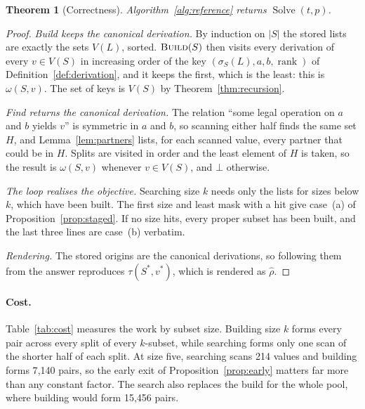 \documentclass[11pt,a4paper]{article}
\newtheorem{theorem}{Theorem}[section]
\theoremstyle{definition}
\theoremstyle{remark}
\newcommand{\proc}[1]{\textnormal{\textsc{#1}}}
\begin{document}
\begin{theorem}[Correctness]\label{thm:correct}
Algorithm~\ref{alg:reference} returns $\operatorname{Solve}(t, p)$.
\end{theorem}

\begin{proof}
\emph{Build keeps the canonical derivation.} By induction on $|S|$ the stored lists are exactly the sets
$V(L)$, sorted. $\proc{Build}(S)$ then visits every derivation of every $v \in V(S)$ in increasing order of
the key $(\sigma_S(L), a, b, \operatorname{rank})$ of Definition~\ref{def:derivation}, and it keeps the first,
which is the least: this is $\omega(S, v)$. The set of keys is $V(S)$ by Theorem~\ref{thm:recursion}.

\emph{Find returns the canonical derivation.} The relation ``some legal operation on $a$ and $b$ yields $v$''
is symmetric in $a$ and $b$, so scanning either half finds the same set $H$, and Lemma~\ref{lem:partners}
lists, for each scanned value, every partner that could be in $H$. Splits are visited in order and the
least element of $H$ is taken, so the result is $\omega(S, v)$ whenever $v \in V(S)$, and $\bot$ otherwise.

\emph{The loop realises the objective.} Searching size $k$ needs only the lists for sizes below $k$, which
have been built. The first size and least mask with a hit give case~(a) of Proposition~\ref{prop:staged}. If
no size hits, every proper subset has been built, and the last three lines are case~(b) verbatim.

\emph{Rendering.} The stored origins are the canonical derivations, so following them from the answer
reproduces $\tau(S^*, v^*)$, which is rendered as $\hat\rho$.
\end{proof}

\paragraph{Cost.}
Table~\ref{tab:cost} measures the work by subset size. Building size $k$ forms every pair across every split
of every $k$-subset, while searching forms only one scan of the shorter half of each split. At size five,
searching scans 214 values and building forms 7{,}140 pairs, so the early exit of
Proposition~\ref{prop:early} matters far more than any constant factor. The search also replaces the
build for the whole pool, where building would form 15{,}456 pairs.
\end{document}
